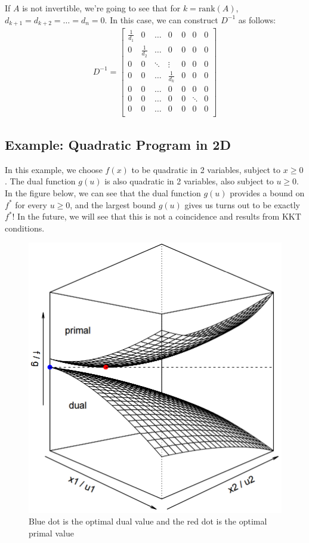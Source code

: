 \documentclass[11pt]{article}
\begin{document}
If $A$ is not invertible, we're going to see that for $k = \text{rank}(A)$,
$d_{k+1} = d_{k+2} = \dots = d_n = 0$. In this case, we can construct $D^{-1}$ as follows:
\begin{align*}
D^{-1} = \begin{bmatrix}
\frac{1}{d_1} & 0 & \dots & 0 & 0  & 0 & 0\\
0 & \frac{1}{d_2} & \dots & 0 & 0  & 0 & 0\\
0 & 0 & \ddots & \vdots & 0  & 0 & 0\\
0 & 0 & \dots & \frac{1}{d_k} & 0  & 0 & 0\\
0 & 0 & \dots & 0 & 0  & 0 & 0\\
0 & 0 & \dots & 0 & 0  & \ddots & 0\\
0 & 0 & \dots & 0 & 0  & 0 & 0\\
\end{bmatrix}
\end{align*}

\subsection{Example: Quadratic Program in 2D}
\label{sec:exampl-quadr-progr}

In this example, we choose $f(x)$ to be quadratic in 2 variables, subject to $ x \geq 0$. The dual function $g(u)$ is also quadratic in 2 variables, also subject to $u \geq 0$. In the figure below, we can see that the dual function $g(u)$ provides a bound on $f^*$ for every $u \geq 0$, and the largest bound $g(u)$ gives us turns out to be exactly $f^*$! In the future, we will see that this is not a coincidence and results from KKT conditions.

\begin{figure}[h]
  \centering
  \includegraphics[scale=0.3]{quad.png}
  \caption{Blue dot is the optimal dual value and the red dot is the optimal primal value}
  \label{fig:quad}
\end{figure}
\end{document}
